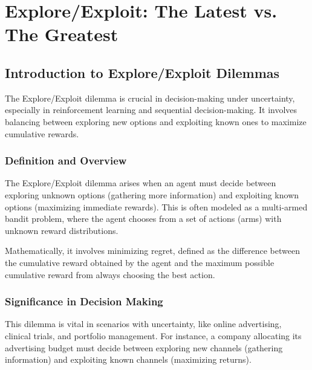 \documentclass[12pt]{book} %
\begin{document}
\chapter{Explore/Exploit: The Latest vs. The Greatest}

\section{Introduction to Explore/Exploit Dilemmas}

The Explore/Exploit dilemma is crucial in decision-making under uncertainty, especially in reinforcement learning and sequential decision-making. It involves balancing between exploring new options and exploiting known ones to maximize cumulative rewards.

\subsection{Definition and Overview}

The Explore/Exploit dilemma arises when an agent must decide between exploring unknown options (gathering more information) and exploiting known options (maximizing immediate rewards). This is often modeled as a multi-armed bandit problem, where the agent chooses from a set of actions (arms) with unknown reward distributions.

Mathematically, it involves minimizing regret, defined as the difference between the cumulative reward obtained by the agent and the maximum possible cumulative reward from always choosing the best action.

\subsection{Significance in Decision Making}

This dilemma is vital in scenarios with uncertainty, like online advertising, clinical trials, and portfolio management. For instance, a company allocating its advertising budget must decide between exploring new channels (gathering information) and exploiting known channels (maximizing returns).
\end{document}
